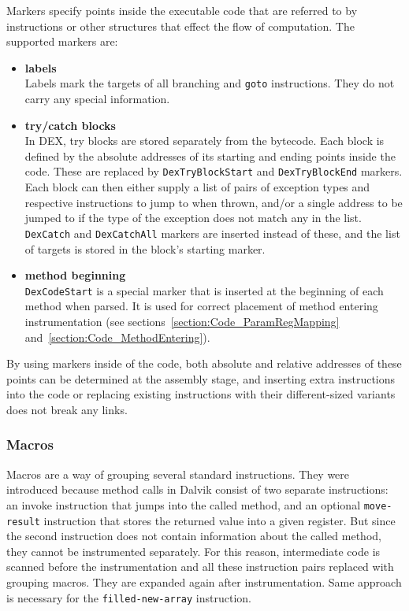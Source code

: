 \documentclass[12pt,twoside,notitlepage]{report}
\begin{document}
Markers specify points inside the executable code that are referred to by instructions or other structures that effect the flow of computation. The supported markers are:
\begin{itemize}
\item \textbf{labels} \\
Labels mark the targets of all branching and \verb$goto$ instructions. They do not carry any special information.
\item \textbf{try/catch blocks} \\
In DEX, try blocks are stored separately from the bytecode. Each block is defined by the absolute addresses of its starting and ending points inside the code. These are replaced by \verb$DexTryBlockStart$ and \verb$DexTryBlockEnd$ markers. Each block can then either supply a list of pairs of exception types and respective instructions to jump to when thrown, and/or a single address to be jumped to if the type of the exception does not match any in the list. \verb$DexCatch$ and \verb$DexCatchAll$ markers are inserted instead of these, and the list of targets is stored in the block's starting marker. 
\item \textbf{method beginning} \\
\verb$DexCodeStart$ is a special marker that is inserted at the beginning of each method when parsed. It is used for correct placement of method entering instrumentation (see sections~\ref{section:Code_ParamRegMapping} and~\ref{section:Code_MethodEntering}).

\end{itemize}

By using markers inside of the code, both absolute and relative addresses of these points can be determined at the assembly stage, and inserting extra instructions into the code or replacing existing instructions with their different-sized variants does not break any links.

\subsubsection{Macros}
\label{section:Code_Macros}

Macros are a way of grouping several standard instructions. They were introduced because method calls in Dalvik consist of two separate instructions: an invoke instruction that jumps into the called method, and an optional \verb$move-result$ instruction that stores the returned value into a given register. But since the second instruction does not contain information about the called method, they cannot be instrumented separately. For this reason, intermediate code is scanned before the instrumentation and all these instruction pairs replaced with grouping macros. They are expanded again after instrumentation. Same approach is necessary for the \verb$filled-new-array$ instruction.
\end{document}
